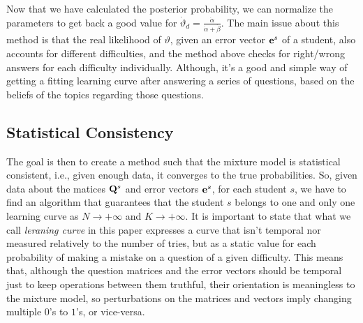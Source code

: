 \documentclass{article}
\newcommand{\0}{\mathbbold{0}}
\newcommand{\1}{\mathds{1}}
\begin{document}
Now that we have calculated the posterior probability, we can normalize the parameters to get back a good value for $\dot{\vartheta}_d = \frac{\dot{\alpha}}{\dot{\alpha}+\dot{\beta}}$.
The main issue about this method is that the real likelihood of $\vartheta$, given an error vector ${\bf e}^s$ of a student, also accounts for different difficulties, and the method above checks for right/wrong answers for each difficulty individually.
Although, it's a good and simple way of getting a fitting learning curve after answering a series of questions, based on the beliefs of the topics regarding those questions.

\subsection{Statistical Consistency}
The goal is then to create a method such that the mixture model is statistical consistent, i.e., given enough data, it converges to the true probabilities.
So, given data about the matices ${\bf Q}^s$ and error vectors ${\bf e}^s$, for each student $s$, we have to find an algorithm that guarantees that the student $s$ belongs to one and only one learning curve as $N \rightarrow +\infty$ and $K \rightarrow +\infty$.
It is important to state that what we call \textsl{leraning curve} in this paper expresses a curve that isn't temporal nor measured relatively to the number of tries, but as a static value for each probability of making a mistake on a question of a given difficulty.
This means that, although the question matrices and the error vectors should be temporal just to keep operations between them truthful, their orientation is meaningless to the mixture model, so perturbations on the matrices and vectors imply changing multiple $0$'s to $1$'s, or vice-versa.
\end{document}
